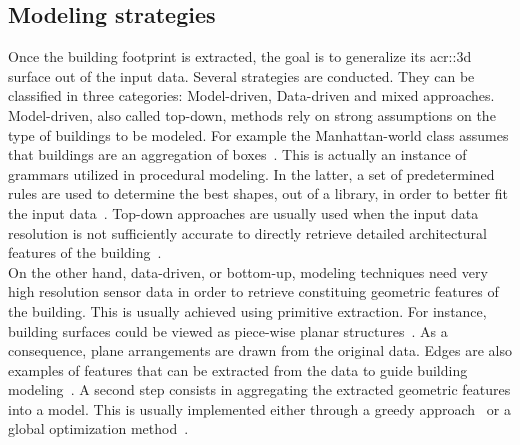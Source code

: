     \subsection{Modeling strategies}
        \label{subsec::state_of_the_art::building_modeling::modeling_strategies}
        Once the building footprint is extracted, the goal is to generalize its \gls{acr::3d} surface out of the input data.
        Several strategies are conducted.
        They can be classified in three categories: Model-driven, Data-driven and mixed approaches.\\

        Model-driven, also called top-down, methods rely on strong assumptions on the type of buildings to be modeled.
        For example the Manhattan-world class assumes that buildings are an aggregation of boxes~\parencite{vanegas2010building,ledoux2011topologically,arroyo2015dimension,li2016manhattan}.
        This is actually an instance of grammars utilized in procedural modeling.
        In the latter, a set of predetermined rules are used to determine the best shapes, out of a library, in order to better fit the input data~\parencite{lafarge2008structural,koutsourakis2009single,zhou20102,mathias2011procedural,martinovic2013bayesian,nan2015template,demir2015procedural,zeng2018neural}.
        Top-down approaches are usually used when the input data resolution is not sufficiently accurate to directly retrieve detailed architectural features of the building~\parencite{lafarge2008structural}.\\

        On the other hand, data-driven, or bottom-up, modeling techniques need very high resolution sensor data in order to retrieve constituing geometric features of the building.
        This is usually achieved using primitive extraction.
        For instance, building surfaces could be viewed as piece-wise planar structures~\parencite{taillandier2004automatic,lafarge2012creating,nan2017polyfit}.
        As a consequence, plane arrangements are drawn from the original data.
        Edges are also examples of features that can be extracted from the data to guide building modeling~\parencite{baillard1999automatic}.
        A second step consists in aggregating the extracted geometric features into a model.
        This is usually implemented either through a greedy approach~\parencite{taillandier2004automatic} or a global optimization method~\parencite{poullis2013framework,verdie2015lod,zhu2018large,holzmann2018semantically}.\\

